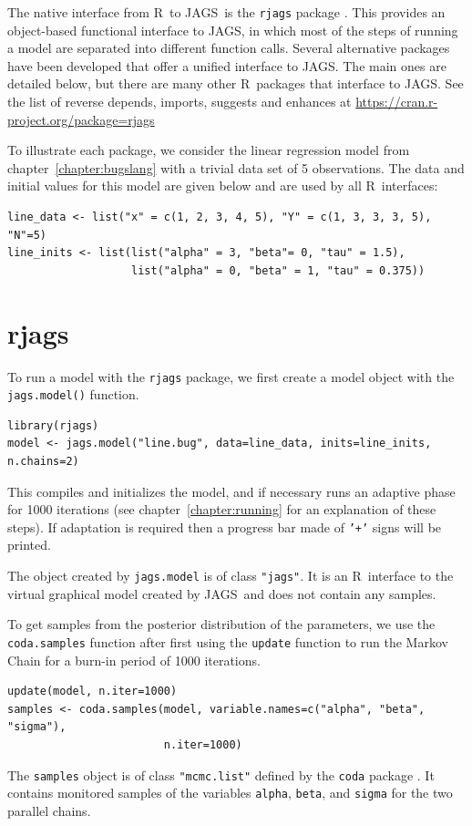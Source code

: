 \documentclass[11pt, a4paper, titlepage]{report}
\newcommand{\JAGS}{\textsf{JAGS}}
\newcommand{\R}{\textsf{R}}
\begin{document}
The native interface from \R\ to \JAGS\ is the \texttt{rjags} package
\citep{Plummer2016}. This provides an object-based functional
interface to \JAGS, in which most of the steps of running a model are
separated into different function calls. Several alternative packages
have been developed that offer a unified interface to \JAGS. The
main ones are detailed below, but there are many other \R\ packages that
interface to \JAGS. See the list of reverse depends, imports, suggests
and enhances at \url{https://cran.r-project.org/package=rjags}

To illustrate each package, we consider the linear regression
model from chapter~\ref{chapter:bugslang} with a trivial data set
of 5 observations. The data and initial values for this model
are given below and are used by all \R\ interfaces:
\begin{verbatim}
line_data <- list("x" = c(1, 2, 3, 4, 5), "Y" = c(1, 3, 3, 3, 5), "N"=5)
line_inits <- list(list("alpha" = 3, "beta"= 0, "tau" = 1.5),
                   list("alpha" = 0, "beta" = 1, "tau" = 0.375))
\end{verbatim}

\section{rjags}
\label{section:R:rjags}

To run a model with the \texttt{rjags} package, we first create a model
object with the \texttt{jags.model()} function.
\begin{verbatim}
library(rjags)
model <- jags.model("line.bug", data=line_data, inits=line_inits, n.chains=2)
\end{verbatim}
This compiles and initializes the model, and if necessary runs an
adaptive phase for 1000 iterations (see chapter~\ref{chapter:running}
for an explanation of these steps). If adaptation is required then a
progress bar made of \texttt{'+'} signs will be printed.

The object created by \texttt{jags.model} is of class \texttt{"jags"}. It is
an \R\ interface to the virtual graphical model created by \JAGS\ and does
not contain any samples.

To get samples from the posterior distribution of the parameters, we
use the \texttt{coda.samples} function after first using the
\texttt{update} function to run the Markov Chain for a burn-in period
of 1000 iterations.
\begin{verbatim}
update(model, n.iter=1000) 
samples <- coda.samples(model, variable.names=c("alpha", "beta", "sigma"), 
                        n.iter=1000)
\end{verbatim}
The \texttt{samples} object is of class \texttt{"mcmc.list"} defined by
the \texttt{coda} package \citep{PlummerEtal2005}. It contains
monitored samples of the variables \texttt{alpha}, \texttt{beta}, and
\texttt{sigma} for the two parallel chains.
\end{document}
